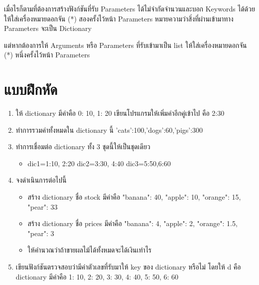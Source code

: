 เมื่อไรก็ตามที่ต้องการสร้างฟังก์ชันที่รับ Parameters ได้ไม่จำกัดจำนวนและบอก Keywords ได้ด้วย ให้ใส่เครื่องหมายดอกจัน (*) สองครั้งไว้หน้า Parameters หมายความว่าสิ่งที่ผ่านเข้ามาทาง Parameters จะเป็น Dictionary 

แต่หากต้องการให้ Arguments หรือ Parameters ที่รับเข้ามาเป็น list ให้ใส่เครื่องหมายดอกจัน (*) หนึ่งครั้งไว้หน้า Parameters 

\section{แบบฝึกหัด}

\begin{enumerate} 
\item ให้ dictionary มีค่าคือ {0: 10, 1: 20} เขียนโปรแกรมให้เพิ่มค่าอีกคู่เข้าไป คือ 2:30
\item ทำการรวมค่าทั้งหมดใน dictionary นี้ {'cats':100,'dogs':60,'pigs':300}
\item ทำการเชื่อมต่อ dictionary ทั้ง 3 ชุดนี้ให้เป็นชุดเดียว
	\begin{itemize}
		\item dic1={1:10, 2:20} dic2={3:30, 4:40} dic3={5:50,6:60} 
	\end{itemize}
\item จงดำเนินการต่อไปนี้
	\begin{itemize}
		\item สร้าง dictionary ชื่อ stock มีค่าคือ "banana": 40, "apple": 10, "orange": 15, "pear": 33
		\item สร้าง dictionary ชื่อ prices มีค่าคือ "banana": 4, "apple": 2, "orange": 1.5, "pear": 3
		\item ให้คำนวณว่าถ้าขายผลไม้ได้ทั้งหมดจะได้เงินเท่าไร
	\end{itemize}
\item เขียนฟังก์ชันตรวจสอบว่ามีค่าตัวเลขที่รับมาให้ key ของ dictionary หรือไม่ โดยให้ d คือ dictionary มีค่าคือ {1: 10, 2: 20, 3: 30, 4: 40, 5: 50, 6: 60}

\end{enumerate}
